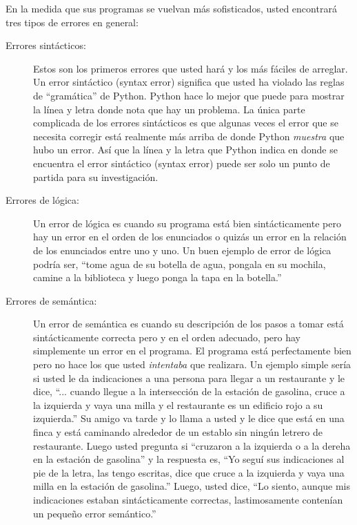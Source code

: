 En la medida que sus programas se vuelvan m\'as sofisticados, usted encontrar\'a tres tipos de errores en general:

\begin{description}

\item[Errores sint\'acticos:] Estos son los primeros errores que usted har\'a y los m\'as f\'aciles de arreglar. Un error sint\'actico (syntax error) significa que usted ha violado las reglas de ``gram\'atica'' de Python.
Python hace lo mejor que puede para mostrar la l\'inea y letra donde nota que hay un problema. La \'unica parte complicada de los errores sint\'acticos es que algunas veces el error que se necesita corregir est\'a realmente m\'as arriba de donde Python 
{\em muestra} que hubo un error. As\'i que la l\'inea y la letra que Python indica en donde se encuentra el error sint\'actico (syntax error) puede ser solo un punto de partida para su investigaci\'on.

\item[Errores de l\'ogica:] Un error de l\'ogica es cuando su programa est\'a bien sint\'acticamente pero hay un error en el orden de los enunciados o quiz\'as un error en la relaci\'on de los enunciados entre uno y uno. Un buen ejemplo de error de l\'ogica podr\'ia ser, ``tome agua de su botella de agua, pongala en su mochila, camine a la biblioteca y luego ponga la tapa en la botella.''

\item[Errores de sem\'antica:] Un error de sem\'antica es cuando su descripci\'on de los pasos a tomar est\'a sint\'acticamente correcta pero y en el orden adecuado, pero hay simplemente un error en el programa. El programa est\'a perfectamente bien pero no hace los que usted {\em intentaba} que realizara. Un ejemplo simple ser\'ia si usted le da indicaciones a una persona para llegar a un restaurante y le dice, ``... cuando llegue a la intersecci\'on de la estaci\'on de gasolina, cruce a la izquierda y vaya una milla y el restaurante es un edificio rojo a su izquierda.'' Su amigo va tarde y lo llama a usted y le dice que est\'a en una finca y est\'a caminando alrededor de un establo sin ning\'un letrero de restaurante.  
Luego usted pregunta si ``cruzaron a la izquierda o a la dereha en la estaci\'on de gasolina'' y la respuesta es, ``Yo segu\'i sus indicaciones al pie de la letra, las tengo escritas, dice que cruce a la izquierda y vaya una milla en la estaci\'on de gasolina.'' Luego, usted dice,
``Lo siento, aunque mis indicaciones estaban sint\'acticamente correctas, lastimosamente conten\'ian un peque\~no error sem\'antico.'' 

\end{description}

